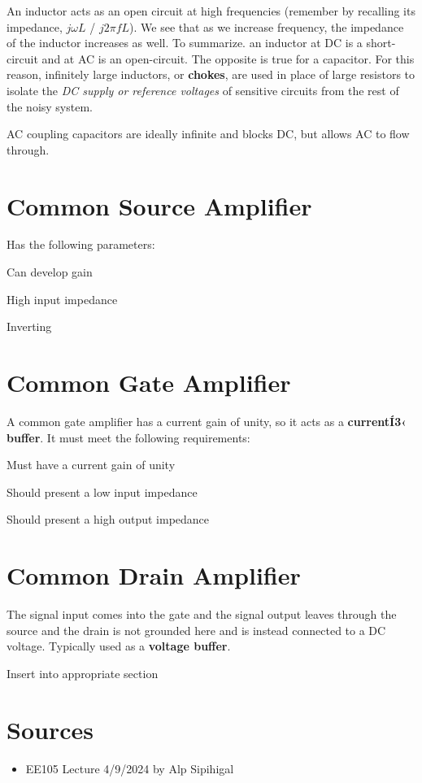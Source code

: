 An inductor acts as an open circuit at high frequencies (remember by recalling its impedance, $j \omega L$ / $j 2 \pi f L$). We see that as we increase frequency, the impedance of the inductor increases as well. To summarize. an inductor at DC is a short-circuit and at AC is an open-circuit. The opposite is true for a capacitor. For this reason, infinitely large inductors, or \textbf{chokes}, are used in place of large resistors to isolate the \textit{DC supply or reference voltages} of sensitive circuits from the rest of the noisy system. 

AC coupling capacitors are ideally infinite and blocks DC, but allows AC to flow through.

\section{Common Source Amplifier}
Has the following parameters:
\begin{pline}
    \item Can develop gain
    \item High input impedance
    \item Inverting
\end{pline}

\section{Common Gate Amplifier}
A common gate amplifier has a current gain of unity, so it acts as a \textbf{currentÍ3‹ buffer}. It must meet the following requirements:
\begin{pline}
    \item Must have a current gain of unity
    \item Should present a low input impedance
    \item Should present a high output impedance
\end{pline}

\section{Common Drain Amplifier}
The signal input comes into the gate and the signal output leaves through the source and the drain is not grounded here and is instead connected to a DC voltage. Typically used as a \textbf{voltage buffer}.

\begin{todo}
    \item Insert into appropriate section
\end{todo}



\section{Sources}
\begin{itemize}
    \item EE105 Lecture 4/9/2024 by Alp Sipihigal
\end{itemize}